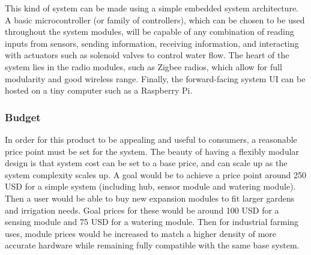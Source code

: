 \documentclass[]{article}
\begin{document}
This kind of system can be made using a simple embedded system architecture. A basic microcontroller (or family of controllers), which can be chosen to be used throughout the system modules, will be capable of any combination of reading inputs from sensors, sending information, receiving information, and interacting with actuators such as solenoid valves to control water flow. The heart of the system lies in the radio modules, such as Zigbee radios, which allow for full modularity and good wireless range. Finally, the forward-facing system UI can be hosted on a tiny computer such as a Raspberry Pi.\\


\subsubsection*{Budget}
In order for this product to be appealing and useful to consumers, a reasonable price point must be set for the system. The beauty of having a flexibly modular design is that system cost can be set to a base price, and can scale up as the system complexity scales up. A goal would be to achieve a price point around 250 USD for a simple system (including hub, sensor module and watering module). Then a user would be able to buy new expansion modules to fit larger gardens and irrigation needs. Goal prices for these would be around 100 USD for a sensing module and 75 USD for a watering module. Then for industrial farming uses, module prices would be increased to match a higher density of more accurate hardware while remaining fully compatible with the same base system.\\
\end{document}
